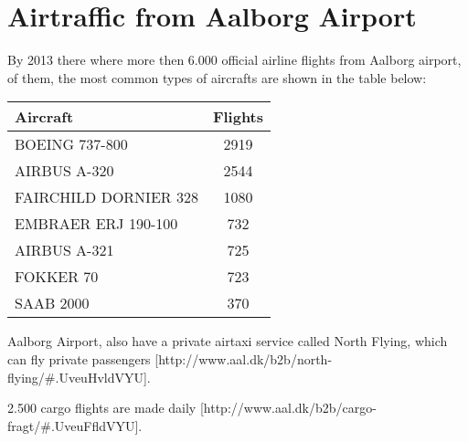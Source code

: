 \section{Airtraffic from Aalborg Airport}

By 2013 there where more then 6.000 official airline flights from Aalborg airport, of them, the most common types of aircrafts are shown in the table below:

\begin{center}
    \begin{tabular}{ | l | c | }
        \hline
        Aircraft & Flights\\ \hline
        BOEING 737-800 & 2919\\ \hline
        AIRBUS A-320 & 2544\\ \hline
        FAIRCHILD DORNIER 328 & 1080\\ \hline
        EMBRAER ERJ 190-100 & 732\\ \hline
        AIRBUS A-321 & 725\\ \hline
        FOKKER 70 & 723\\ \hline
        SAAB 2000 & 370\\ \hline
    \end{tabular}
\end{center}


Aalborg Airport, also have a private airtaxi service called North Flying, which can fly private passengers [http://www.aal.dk/b2b/north-flying/\#.UveuHvldVYU].

2.500 cargo flights are made daily [http://www.aal.dk/b2b/cargo-fragt/\#.UveuFfldVYU].


